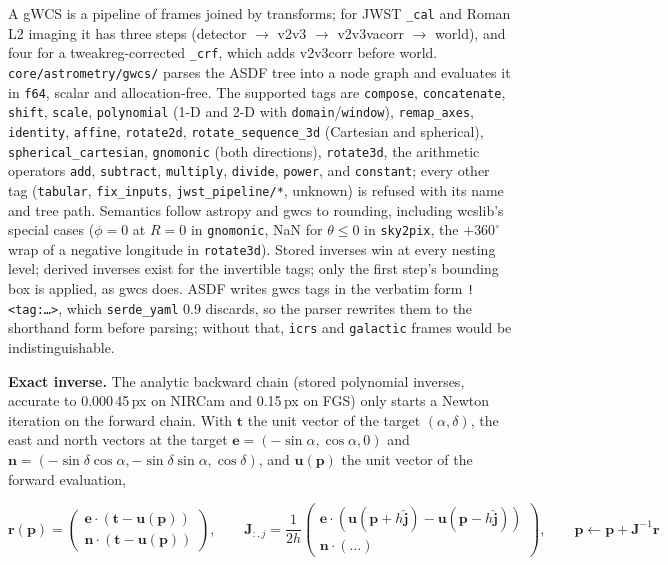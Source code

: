 \documentclass[11pt,a4paper]{article}
\newcommand{\code}[1]{\texttt{\small #1}}
\newcommand{\crate}[1]{\texttt{#1}}
\newcommand{\mat}[1]{\mathbf{#1}}
\begin{document}
    A gWCS is a pipeline of frames joined by transforms; for JWST \code{\_cal} and Roman L2 imaging it has three steps (detector $\to$ v2v3 $\to$ v2v3vacorr $\to$ world), and four for a tweakreg-corrected \code{\_crf}, which adds v2v3corr before world. \code{core/astrometry/gwcs/} parses the ASDF tree into a node graph and evaluates it in \code{f64}, scalar and allocation-free. The supported tags are \code{compose}, \code{concatenate}, \code{shift}, \code{scale}, \code{polynomial} (1-D and 2-D with \code{domain}/\code{window}), \code{remap\_axes}, \code{identity}, \code{affine}, \code{rotate2d}, \code{rotate\_sequence\_3d} (Cartesian and spherical), \code{spherical\_cartesian}, \code{gnomonic} (both directions), \code{rotate3d}, the arithmetic operators \code{add}, \code{subtract}, \code{multiply}, \code{divide}, \code{power}, and \code{constant}; every other tag (\code{tabular}, \code{fix\_inputs}, \code{jwst\_pipeline/*}, unknown) is refused with its name and tree path. Semantics follow astropy and gwcs to rounding, including wcslib's special cases ($\phi = 0$ at $R = 0$ in \code{gnomonic}, NaN for $\theta \le 0$ in \code{sky2pix}, the $+360^{\circ}$ wrap of a negative longitude in \code{rotate3d}). Stored inverses win at every nesting level; derived inverses exist for the invertible tags; only the first step's bounding box is applied, as gwcs does. ASDF writes gwcs tags in the verbatim form \code{!<tag:\ldots>}, which \crate{serde\_yaml} 0.9 discards, so the parser rewrites them to the shorthand form before parsing; without that, \code{icrs} and \code{galactic} frames would be indistinguishable.

    \textbf{Exact inverse.} The analytic backward chain (stored polynomial inverses, accurate to 0.000\,45\,px on NIRCam and 0.15\,px on FGS) only starts a Newton iteration on the forward chain. With $\mathbf{t}$ the unit vector of the target $(\alpha, \delta)$, the east and north vectors at the target $\mathbf{e} = (-\sin\alpha, \cos\alpha, 0)$ and $\mathbf{n} = (-\sin\delta\cos\alpha, -\sin\delta\sin\alpha, \cos\delta)$, and $\mathbf{u}(\mathbf{p})$ the unit vector of the forward evaluation,

    \begin{equation}
        \mathbf{r}(\mathbf{p}) = \begin{pmatrix} \mathbf{e} \cdot (\mathbf{t} - \mathbf{u}(\mathbf{p})) \\ \mathbf{n} \cdot (\mathbf{t} - \mathbf{u}(\mathbf{p})) \end{pmatrix}, \qquad
        \mat{J}_{:,j} = \frac{1}{2h}\begin{pmatrix} \mathbf{e} \cdot (\mathbf{u}(\mathbf{p} + h\hat{\mathbf{j}}) - \mathbf{u}(\mathbf{p} - h\hat{\mathbf{j}})) \\ \mathbf{n} \cdot (\ldots) \end{pmatrix}, \qquad
        \mathbf{p} \leftarrow \mathbf{p} + \mat{J}^{-1}\mathbf{r}
    \end{equation}
\end{document}
